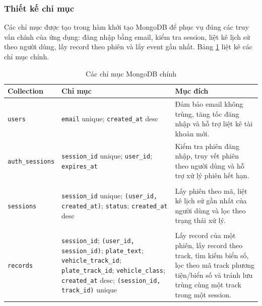 \documentclass[../DoAn.tex]{subfiles}
\begin{document}
\subsubsection{Thiết kế chỉ mục}

Các chỉ mục được tạo trong hàm khởi tạo MongoDB để phục vụ đúng các truy vấn chính của ứng dụng: đăng nhập bằng email, kiểm tra session, liệt kê lịch sử theo người dùng, lấy record theo phiên và lấy event gần nhất. Bảng \ref{tab:mongodb-indexes} liệt kê các chỉ mục chính.

\begin{table}[H]
\centering
\caption{Các chỉ mục MongoDB chính}
\label{tab:mongodb-indexes}
\renewcommand{\arraystretch}{1.12}
\begin{tabular}{|>{\raggedright\arraybackslash}p{3.4cm}|>{\raggedright\arraybackslash}p{5.6cm}|>{\raggedright\arraybackslash}p{5.4cm}|}
\hline
\textbf{Collection} & \textbf{Chỉ mục} & \textbf{Mục đích} \\
\hline
\texttt{users} & \texttt{email} unique; \newline \texttt{created\_at} desc & Đảm bảo email không trùng, tăng tốc đăng nhập và hỗ trợ liệt kê tài khoản mới. \\
\hline
\texttt{auth\_sessions} & \texttt{session\_id} unique; \newline \texttt{user\_id}; \newline \texttt{expires\_at} & Kiểm tra phiên đăng nhập, truy vết phiên theo người dùng và hỗ trợ xử lý phiên hết hạn. \\
\hline
\shortstack[l]{\texttt{recognition\_}\\\texttt{sessions}} & \texttt{session\_id} unique; \newline \texttt{(user\_id, created\_at)}; \newline \texttt{status}; \newline \texttt{created\_at} desc & Lấy phiên theo mã, liệt kê lịch sử gần nhất của người dùng và lọc theo trạng thái xử lý. \\
\hline
\shortstack[l]{\texttt{recognition\_}\\\texttt{records}} & \texttt{session\_id}; \newline \texttt{(user\_id, session\_id)}; \newline \texttt{plate\_text}; \newline \texttt{vehicle\_track\_id}; \newline \texttt{plate\_track\_id}; \newline \texttt{vehicle\_class}; \newline \texttt{created\_at} desc; \newline \texttt{(session\_id, track\_id)} unique & Lấy record của một phiên, lấy record theo track, tìm kiếm biển số, lọc theo mã track phương tiện/biển số và tránh lưu trùng cùng một track trong một session. \\

\end{tabular}
\end{table}
\end{document}
